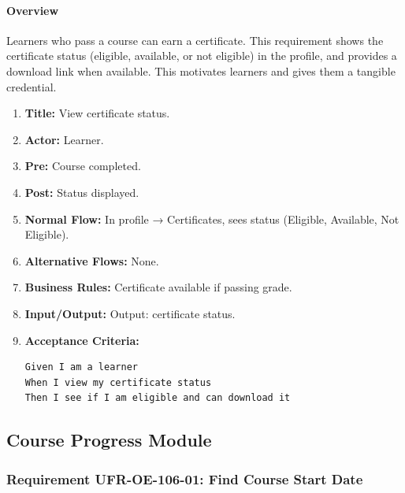 \paragraph{Overview}
Learners who pass a course can earn a certificate. This requirement shows the certificate status (eligible, available, or not eligible) in the profile, and provides a download link when available. This motivates learners and gives them a tangible credential.
\begin{enumerate}[label=\textbf{\arabic*.}]
\item \textbf{Title:} View certificate status.
\item \textbf{Actor:} Learner.
\item \textbf{Pre:} Course completed.
\item \textbf{Post:} Status displayed.
\item \textbf{Normal Flow:} In profile → Certificates, sees status (Eligible, Available, Not Eligible).
\item \textbf{Alternative Flows:} None.
\item \textbf{Business Rules:} Certificate available if passing grade.
\item \textbf{Input/Output:} Output: certificate status.
\item \textbf{Acceptance Criteria:}
    \begin{verbatim}
Given I am a learner
When I view my certificate status
Then I see if I am eligible and can download it
    \end{verbatim}
\end{enumerate}

\subsection{Course Progress Module}
\subsubsection{Requirement UFR-OE-106-01: Find Course Start Date}
